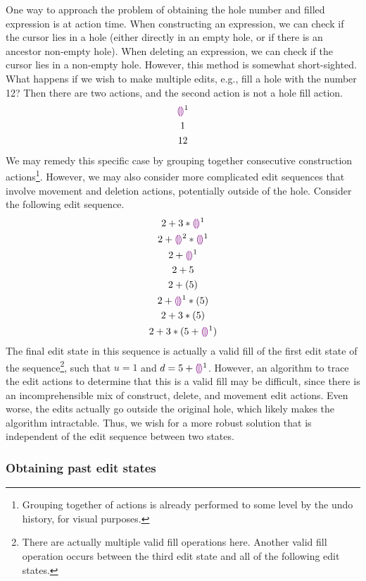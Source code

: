 One way to approach the problem of obtaining the hole number and filled expression is at action time. When constructing an expression, we can check if the cursor lies in a hole (either directly in an empty hole, or if there is an ancestor non-empty hole). When deleting an expression, we can check if the cursor lies in a non-empty hole. However, this method is somewhat short-sighted. What happens if we wish to make multiple edits, e.g., fill a hole with the number 12? Then there are two actions, and the second action is not a hole fill action.
\begin{gather*}
  \textcolor{violet}{\llparenthesis}\textcolor{violet}{\rrparenthesis}^1 \\
  1 \\
  12
\end{gather*}
We may remedy this specific case by grouping together consecutive construction actions\footnote{Grouping together of actions is already performed to some level by the undo history, for visual purposes.}. However, we may also consider more complicated edit sequences that involve movement and deletion actions, potentially outside of the hole. Consider the following edit sequence.
\begin{gather*}
  2+3*\textcolor{violet}{\llparenthesis}\textcolor{violet}{\rrparenthesis}^1 \\
  2+\textcolor{violet}{\llparenthesis}\textcolor{violet}{\rrparenthesis}^2*\textcolor{violet}{\llparenthesis}\textcolor{violet}{\rrparenthesis}^1\\
  2+\textcolor{violet}{\llparenthesis}\textcolor{violet}{\rrparenthesis}^1\\
  2+5 \\
  2+(5) \\
  2+\textcolor{violet}{\llparenthesis}\textcolor{violet}{\rrparenthesis}^1*(5) \\
  2+3*(5) \\
  2+3*(5+\textcolor{violet}{\llparenthesis}\textcolor{violet}{\rrparenthesis}^1)
\end{gather*}
The final edit state in this sequence is actually a valid fill of the first edit state of the sequence\footnote{There are actually multiple valid fill operations here. Another valid fill operation occurs between the third edit state and all of the following edit states.}, such that $u=1$ and $d=5+\textcolor{violet}{\llparenthesis}\textcolor{violet}{\rrparenthesis}^1$. However, an algorithm to trace the edit actions to determine that this is a valid fill may be difficult, since there is an incomprehensible mix of construct, delete, and movement edit actions. Even worse, the edits actually go outside the original hole, which likely makes the algorithm intractable. Thus, we wish for a more robust solution that is independent of the edit sequence between two states.


\subsubsection{Obtaining past edit states}
\label{sec:far-past-edit-states}

